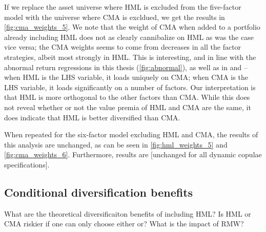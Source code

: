 If we replace the asset universe where HML is excluded from the five-factor model with the universe where CMA is excldued, we get the results in \autoref{fig:cma_weights_5}. We note that the weight of CMA when added to a portfolio already including HML does not as clearly cannibalize on HML as was the case vice versa; the CMA weights seems to come from decreases in all the factor strategies, albeit most strongly in HML. This is interesting, and in line with the abnormal return regressions in this thesis (\autoref{fig:abnormal}), as well as in \textcite{FF2015} and \textcite{Asness2015} -- when HML is the LHS variable, it loads uniquely on CMA; when CMA is the LHS variable, it loads significantly on a number of factors. Our interpretation is that HML is more orthogonal to the other factors than CMA. While this does not reveal whether or not the value premia of HML and CMA are the same, it does indicate that HML is better diversified than CMA. 

When repeated for the six-factor model excluding HML and CMA, the results of this analysis are unchanged, as can be seen in \autoref{fig:hml_weights_5} and \autoref{fig:cma_weights_6}. Furthermore, results are [unchanged for all dynamic copulae specifications].

\subsection{Conditional diversification benefits}
\label{subsec:cdb}

What are the theoretical diversificaiton benefits of including HML? Is HML or CMA riskier if one can only choose either or? What is the impact of RMW?